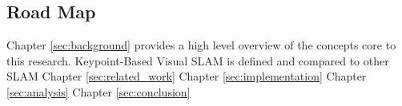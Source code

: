 \subsection{Road Map}

Chapter \ref{sec:background} provides a high level overview of the concepts core to this research. Keypoint-Based Visual SLAM is defined and compared to other SLAM 
Chapter \ref{sec:related_work}
Chapter \ref{sec:implementation}
Chapter \ref{sec:analysis}
Chapter \ref{sec:conclusion}